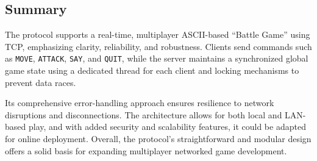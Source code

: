 \documentclass{article}
\begin{document}
\subsection{Summary}

The protocol supports a real-time, multiplayer ASCII-based ``Battle Game'' using TCP, emphasizing clarity, reliability, and robustness. Clients send commands such as \texttt{MOVE}, \texttt{ATTACK}, \texttt{SAY}, and \texttt{QUIT}, while the server maintains a synchronized global game state using a dedicated thread for each client and locking mechanisms to prevent data races.

Its comprehensive error-handling approach ensures resilience to network disruptions and disconnections. The architecture allows for both local and LAN-based play, and with added security and scalability features, it could be adapted for online deployment. Overall, the protocol's straightforward and modular design offers a solid basis for expanding multiplayer networked game development.
\end{document}
